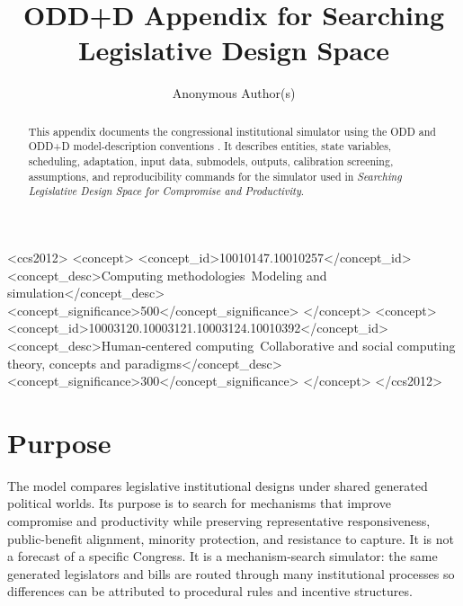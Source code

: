 \documentclass[manuscript,review,anonymous]{acmart}
\begin{document}
\title{ODD+D Appendix for Searching Legislative Design Space}

\author{Anonymous Author(s)}
\renewcommand{\shortauthors}{Anonymous Author(s)}

\begin{abstract}
This appendix documents the congressional institutional simulator using the ODD and ODD+D model-description conventions \citep{Grimm2010,Muller2013}. It describes entities, state variables, scheduling, adaptation, input data, submodels, outputs, calibration screening, assumptions, and reproducibility commands for the simulator used in \emph{Searching Legislative Design Space for Compromise and Productivity}.
\end{abstract}

\begin{CCSXML}
<ccs2012>
<concept>
<concept_id>10010147.10010257</concept_id>
<concept_desc>Computing methodologies~Modeling and simulation</concept_desc>
<concept_significance>500</concept_significance>
</concept>
<concept>
<concept_id>10003120.10003121.10003124.10010392</concept_id>
<concept_desc>Human-centered computing~Collaborative and social computing theory, concepts and paradigms</concept_desc>
<concept_significance>300</concept_significance>
</concept>
</ccs2012>
\end{CCSXML}



\maketitle

\section{Purpose}

The model compares legislative institutional designs under shared generated political worlds. Its purpose is to search for mechanisms that improve compromise and productivity while preserving representative responsiveness, public-benefit alignment, minority protection, and resistance to capture. It is not a forecast of a specific Congress. It is a mechanism-search simulator: the same generated legislators and bills are routed through many institutional processes so differences can be attributed to procedural rules and incentive structures.
\end{document}
